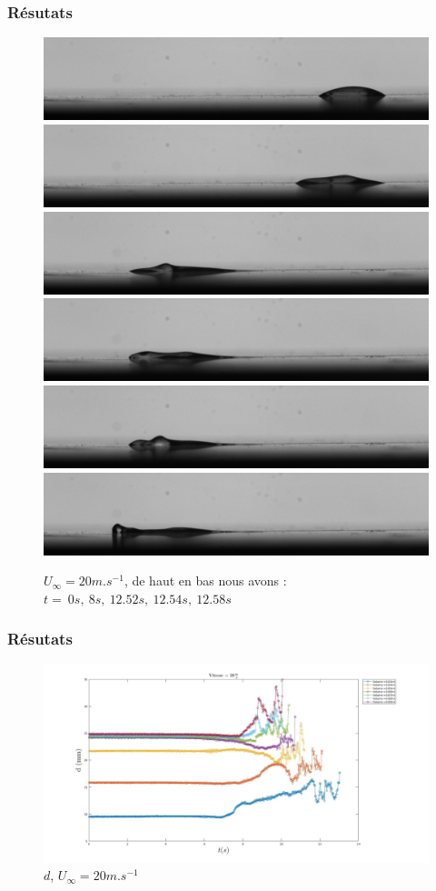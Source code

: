 \documentclass{beamer}
\begin{document}
\begin{frame}
\frametitle{Résutats}
\begin{figure}[!ht]
		\includegraphics[width = 0.35\linewidth]{./image/test.jpg}\\
		\includegraphics[width = 0.35\linewidth]{./image/test400.jpg}\\
		\includegraphics[width = 0.35\linewidth]{./image/test626.jpg}\\
		\includegraphics[width = 0.35\linewidth]{./image/test627.jpg}\\
		\includegraphics[width = 0.35\linewidth]{./image/test628.jpg}\\
		\includegraphics[width = 0.35\linewidth]{./image/test629.jpg}
	\caption{$U_{\infty}=20m.s^{-1}$, de haut en bas nous avons :\\
	$t = ~0s,~8s,~12.52s,~12.54s,~12.58s$}
		\label{fig:test}
\end{figure}
\end{frame}

\begin{frame}
\frametitle{Résutats}
\begin{figure}[!ht]
        \centering
		\includegraphics[width = \linewidth]{./image/v=20d.jpg}
	\caption{$d$, $U_{\infty}=20m.s^{-1}$}
		\label{fig:v=20d}
\end{figure}
\end{frame}
\end{document}
